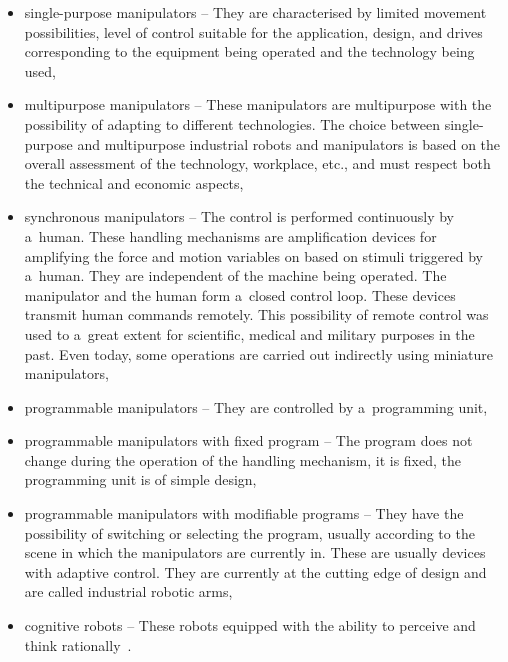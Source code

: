 \begin{itemize}

    \item  single-purpose manipulators -- They are characterised by limited movement possibilities, level of control suitable for the application, design, and drives corresponding to the equipment being operated and the technology being used,

    \item multipurpose manipulators -- These manipulators are multipurpose with the possibility of adapting to different technologies. The choice between single-purpose and multipurpose industrial robots and manipulators is based on the overall assessment of the technology, workplace, etc., and must respect both the technical and economic aspects,

    \item  synchronous manipulators -- The control is performed continuously by a~human. These handling mechanisms are amplification devices for amplifying the force and motion variables on based on stimuli triggered by a~human. They are independent of the machine being operated. The manipulator and the human form a~closed control loop. These devices transmit human commands remotely. This possibility of remote control was used to a~great extent for scientific, medical and military purposes in the past. Even today, some operations are carried out indirectly using miniature manipulators,

    \item  programmable manipulators -- They are controlled by a~programming unit,

    \item  programmable manipulators with fixed program -- The program does not change during the operation of the handling mechanism, it is fixed, the programming unit is of simple design,

    \item  programmable manipulators with modifiable programs -- They have the possibility of switching or selecting the program, usually according to the scene in which the manipulators are currently in. These are usually devices with adaptive control. They are currently at the cutting edge of design and are called industrial robotic arms,

    \item  cognitive robots -- These robots equipped with the ability to perceive and think rationally~\cite{vsb_2007}.

\end{itemize}

